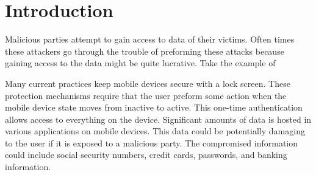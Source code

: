 \section{Introduction}
Malicious parties attempt to gain access to data of their victims. 
Often times these attackers go through the trouble of
preforming these attacks because
gaining access to the data might be quite lucrative.
Take the example of 



Many current practices keep mobile devices secure
with a lock screen.
These protection mechanisms require
that the user preform some action 
when the mobile device state moves from inactive to active.
This one-time authentication allows access 
to everything on the device.
% 
Significant amounts of data is hosted 
in various applications on mobile devices.
This data could be potentially damaging to
the user if it is exposed to a malicious party.
The compromised information could include
social security numbers, credit cards, passwords, and banking information.

